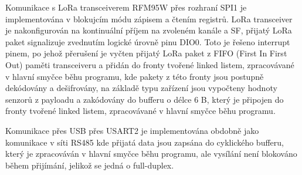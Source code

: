 Komunikace s LoRa transceiverem RFM95W přes rozhraní SPI1 je implementována v blokujcím módu zápisem a čtením registrů. 
LoRa transceiver je nakonfigurován na kontinuální příjem na zvoleném kanále a SF, přijatý LoRa paket signalizuje zvednutím logické úrovně pinu DIO0. Toto je řešeno interrupt pinem, po jehož přerušení je vyčten přijatý LoRa paket z FIFO (First In First Out) paměti transceiveru a přidán do fronty tvořené linked listem, zpracovávané v hlavní smyčce běhu programu, kde pakety z této fronty jsou postupně dekódovány a dešifrovány, na základě typu zařízení jsou vypočteny hodnoty senzorů z payloadu a zakódovány do bufferu o délce 6 B, který je připojen do fronty tvořené linked listem, zpracovávané v hlavní smyčce běhu programu.

Komunikace přes USB přes USART2 je implementována obdobně jako komunikace v síti RS485 kde přijatá data jsou zapsána do cyklického bufferu, který je zpracováván v hlavní smyčce běhu programu, ale vysílání není blokováno během přijímání, jelikož se jedná o full-duplex.





